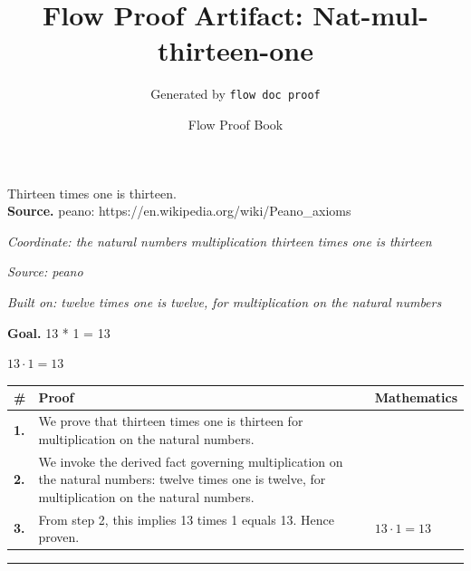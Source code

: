 \documentclass[11pt]{article}
\title{Flow Proof Artifact: Nat-mul-thirteen-one}
\author{Generated by \texttt{flow doc proof}}
\date{Flow Proof Book}
\theoremstyle{definition}
\begin{document}
\maketitle
Thirteen times one is thirteen.\\[0.5em]
\textbf{Source.} peano: https://en.wikipedia.org/wiki/Peano\_axioms\\[0.5em]
\bigskip
{}\par
\smallskip\noindent\textit{Coordinate: the natural numbers \cdot multiplication \cdot thirteen times one is thirteen}\par
\smallskip\noindent\textit{Source: peano}\par
\smallskip\noindent\textit{Built on: twelve times one is twelve, for multiplication on the natural numbers}\par
\medskip
\noindent\textbf{Goal.} 13 * 1 = 13\par
\noindent$\displaystyle 13 \cdot 1 = 13$\par
\medskip
\noindent
\begin{tabular}{@{} >{\raggedright\arraybackslash}p{} >{\raggedright\arraybackslash}p{} >{\raggedleft\arraybackslash}p{} @{}}
\textbf{\#} & \textbf{Proof} & \textbf{Mathematics} \\
\midrule
\textbf{1.} & We prove that thirteen times one is thirteen for multiplication on the natural numbers. & \\[0.45em]
\textbf{2.} & We invoke the derived fact governing multiplication on the natural numbers: twelve times one is twelve, for multiplication on the natural numbers. & \\[0.45em]
\textbf{3.} & From step 2, this implies 13 times 1 equals 13. Hence proven. & $\displaystyle 13 \cdot 1 = 13$ \\[0.45em]
\bottomrule
\end{tabular}
\label{thm:Nat-multiplication-thirteen_times_one_is_thirteen}
\par\medskip\hrule
\end{document}
